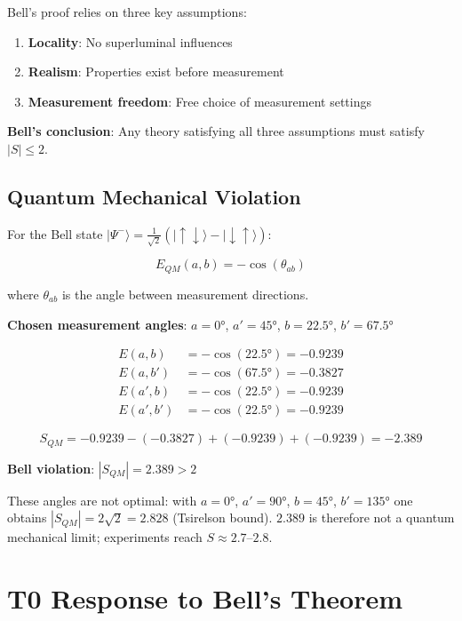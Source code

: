 	Bell's proof relies on three key assumptions:
	
	\begin{enumerate}
		\item \textbf{Locality}: No superluminal influences
		\item \textbf{Realism}: Properties exist before measurement
		\item \textbf{Measurement freedom}: Free choice of measurement settings
	\end{enumerate}
	
	\textbf{Bell's conclusion}: Any theory satisfying all three assumptions must satisfy $|S| \leq 2$.
	
	\subsection{Quantum Mechanical Violation}
	
	For the Bell state $|\Psi^-\rangle = \frac{1}{\sqrt{2}}(|\uparrow\downarrow\rangle - |\downarrow\uparrow\rangle)$:
	
	\begin{equation}
		E_{QM}(a,b) = -\cos(\theta_{ab})
	\end{equation}
	
	where $\theta_{ab}$ is the angle between measurement directions.
	
	\textbf{Chosen measurement angles}: $a = 0°$, $a' = 45°$, $b = 22.5°$, $b' = 67.5°$
	
	\begin{align}
		E(a,b) &= -\cos(22.5°) = -0.9239 \\
		E(a,b') &= -\cos(67.5°) = -0.3827 \\
		E(a',b) &= -\cos(22.5°) = -0.9239 \\
		E(a',b') &= -\cos(22.5°) = -0.9239
	\end{align}
	
	\begin{equation}
		S_{QM} = -0.9239 - (-0.3827) + (-0.9239) + (-0.9239) = -2.389
	\end{equation}
	
	\textbf{Bell violation}: $|S_{QM}| = 2.389 > 2$
	
	These angles are not optimal: with $a = 0°$, $a' = 90°$, $b = 45°$, $b' = 135°$ one obtains $|S_{QM}| = 2\sqrt2 = 2.828$ (Tsirelson bound). $2.389$ is therefore not a quantum mechanical limit; experiments reach $S \approx 2.7$--$2.8$.
	
	\section{T0 Response to Bell's Theorem}
	
